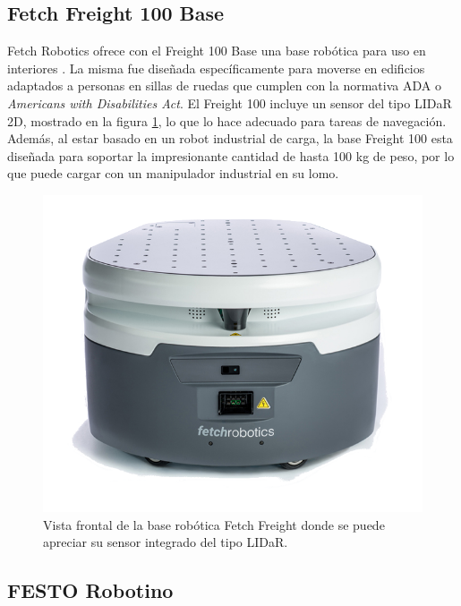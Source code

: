 \subsection{Fetch Freight 100 Base}

Fetch Robotics ofrece con el Freight 100 Base una base robótica para uso en interiores \citep{PAPER:1}. La misma fue diseñada específicamente para moverse en edificios adaptados a personas en sillas de ruedas que cumplen con la normativa ADA o \textit{Americans with Disabilities Act}.\newline
El Freight 100 incluye un sensor del tipo LIDaR 2D, mostrado en la figura \ref{fig:robotFreight}, lo que lo hace adecuado para tareas de navegación. Además, al estar basado en un robot industrial de carga, la base Freight 100 esta diseñada para soportar la impresionante cantidad de hasta 100 kg de peso, por lo que puede cargar con un manipulador industrial en su lomo.

\begin{figure}[ht]
	\centering
	\includegraphics[scale=1.0]{./Figures/freight.png}
	\caption{Vista frontal de la base robótica Fetch Freight donde se puede apreciar su sensor integrado del tipo LIDaR.\protect\footnotemark}
	\label{fig:robotFreight}
\end{figure}


\subsection{FESTO Robotino}

